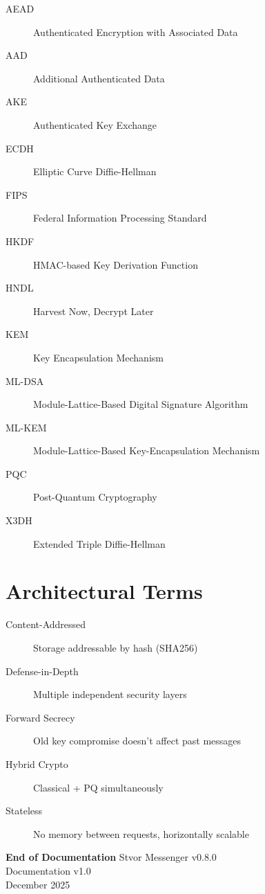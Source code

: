 \documentclass[11pt,a4paper,oneside]{book}
\begin{document}
\begin{description}
  \item[AEAD] Authenticated Encryption with Associated Data
  \item[AAD] Additional Authenticated Data
  \item[AKE] Authenticated Key Exchange
  \item[ECDH] Elliptic Curve Diffie-Hellman
  \item[FIPS] Federal Information Processing Standard
  \item[HKDF] HMAC-based Key Derivation Function
  \item[HNDL] Harvest Now, Decrypt Later
  \item[KEM] Key Encapsulation Mechanism
  \item[ML-DSA] Module-Lattice-Based Digital Signature Algorithm
  \item[ML-KEM] Module-Lattice-Based Key-Encapsulation Mechanism
  \item[PQC] Post-Quantum Cryptography
  \item[X3DH] Extended Triple Diffie-Hellman
\end{description}
\vspace{-0.3cm}\section{Architectural Terms}
\begin{description}
  \item[Content-Addressed] Storage addressable by hash (SHA256)
  \item[Defense-in-Depth] Multiple independent security layers
  \item[Forward Secrecy] Old key compromise doesn't affect past messages
  \item[Hybrid Crypto] Classical + PQ simultaneously
  \item[Stateless] No memory between requests, horizontally scalable
\end{description}
\begin{center}
  \Large{\textbf{End of Documentation}}
    Stvor Messenger v0.8.0 \\
  Documentation v1.0 \\
  December 2025
\end{center}
\end{document}
